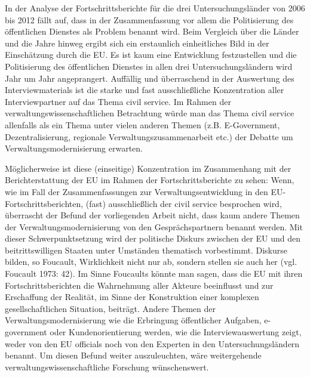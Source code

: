 In der Analyse der Fortschrittsberichte für die drei Untersuchungsländer von 2006 bis 2012 fällt auf, dass in der Zusammenfassung vor allem die Politisierung des öffentlichen Dienstes als Problem benannt wird. Beim Vergleich über die Länder und die Jahre hinweg ergibt sich ein erstaunlich einheitliches Bild in der Einschätzung durch die EU. Es ist kaum eine Entwicklung festzustellen und die Politisierung des öffentlichen Dienstes in allen drei Untersuchungsländern wird Jahr um Jahr angeprangert. Auffällig und überraschend in der Auswertung des Interviewmaterials ist die starke und fast ausschließliche Konzentration aller Interviewpartner auf das Thema civil service. Im Rahmen der verwaltungswissenschaftlichen Betrachtung würde man das Thema civil service allenfalls als ein Thema unter vielen anderen Themen (z.B. E-Government, Dezentralisierung, regionale Verwaltungszusammenarbeit etc.) der Debatte um Verwaltungsmodernisierung erwarten.\par
Möglicherweise ist diese (einseitige) Konzentration im Zusammenhang mit der Berichterstattung der EU im Rahmen der Fortschrittsberichte zu sehen: Wenn, wie im Fall der Zusammenfassungen zur Verwaltungsentwicklung in den EU-Fortschrittsberichten, (fast) ausschließlich der civil service besprochen wird, überrascht der Befund der vorliegenden Arbeit nicht, dass kaum andere Themen der Verwaltungsmodernisierung von den Gesprächspartnern benannt werden. Mit dieser Schwerpunktsetzung wird der politische Diskurs zwischen der EU und den beitrittswilligen Staaten unter Umständen thematisch vorbestimmt. Diskurse bilden, so Foucault, Wirklichkeit nicht nur ab, sondern stellen sie auch her (vgl. Foucault 1973: 42). Im Sinne Foucaults könnte man sagen, dass die EU mit ihren Fortschrittsberichten die Wahrnehmung aller Akteure beeinflusst und zur Erschaffung der Realität, im Sinne der Konstruktion einer komplexen gesellschaftlichen Situation, beiträgt. Andere Themen der Verwaltungsmodernisierung wie die Erbringung öffentlicher Aufgaben, e-government oder Kundenorientierung werden, wie die Interviewauswertung zeigt, weder von den EU officials noch von den Experten in den Untersuchungsländern benannt. Um diesen Befund weiter auszuleuchten, wäre weitergehende verwaltungswissenschaftliche Forschung wünschenswert. \par
